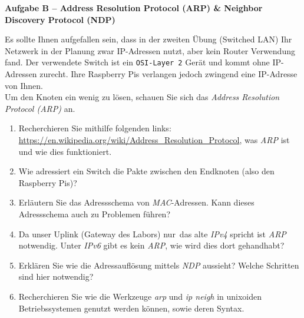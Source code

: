 \documentclass[paper=a4,fontsize=11pt]{scrartcl}%
\numberwithin{equation}{section}
\begin{document}
\begin{center}\Large{\textbf{Aufgabe B -- Address Resolution Protocol (ARP) \& Neighbor Discovery Protocol (NDP)}}\end{center}\vskip0.25in
Es sollte Ihnen aufgefallen sein, dass in der zweiten Übung (Switched LAN) Ihr Netzwerk in der Planung zwar IP-Adressen nutzt, aber kein Router Verwendung fand. Der verwendete Switch ist ein \texttt{OSI-Layer 2} Gerät und kommt ohne IP-Adressen zurecht. Ihre Raspberry Pis verlangen jedoch zwingend eine IP-Adresse von Ihnen.\\
Um den Knoten ein wenig zu lösen, schauen Sie sich das \emph{Address Resolution Protocol (ARP)} an.
\begin{enumerate}
		\item Recherchieren Sie mithilfe folgenden links: \url{https://en.wikipedia.org/wiki/Address_Resolution_Protocol}, was \emph{ARP} ist und wie dies funktioniert.
		\item Wie adressiert ein Switch die Pakte zwischen den Endknoten (also den Raspberry Pis)?
		\item Erläutern Sie das Adressschema von \emph{MAC}-Adressen. Kann dieses Adressschema auch zu Problemen führen?
		\item Da unser Uplink (Gateway des Labors) \glqq nur\grqq\ das alte \emph{IPv4} spricht ist \emph{ARP} notwendig. Unter \emph{IPv6} gibt es kein \emph{ARP}, wie wird dies dort gehandhabt?
		\item Erklären Sie wie die Adressauflösung mittels \emph{NDP} aussieht? Welche Schritten sind hier notwendig?
		\item Recherchieren Sie wie die Werkzeuge \emph{arp} und \emph{ip neigh} in unixoiden Betriebssystemen genutzt werden können, sowie deren Syntax.
\end{enumerate}
\end{document}
